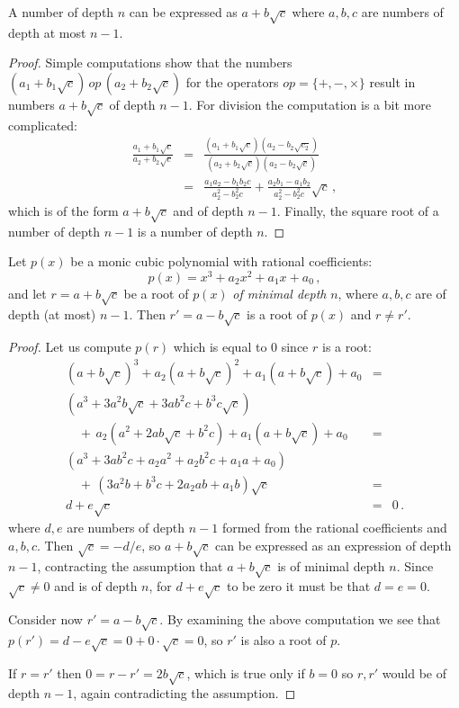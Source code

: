 \begin{theorem}
A number of depth $n$ can be expressed as $a+b\sqrt{c}$ where $a,b,c$ are numbers of depth at most $n-1$.
\end{theorem}
\begin{proof}
Simple computations show that the numbers $(a_1+b_1\sqrt{c})\,\mathit{op}\,(a_2+b_2\sqrt{c})$ for the operators $\mathit{op}=\{+,-,\times\}$ result in numbers $a+b\sqrt{c}$ of depth $n-1$. For division the computation is a bit more complicated:
\begin{eqnarray*}
\frac{a_1+b_1\sqrt{c}}{a_2+b_2\sqrt{c}}&=&
\frac{(a_1+b_1\sqrt{c})(a_2-b_2\sqrt{c_2})}{(a_2+b_2\sqrt{c})(a_2-b_2\sqrt{c})}\\
&=&\frac{a_1a_2-b_1b_2c}{a_2^2-b_2^2c}+\frac{a_2b_1-a_1b_2}{a_2^2-b_2^2c}\sqrt{c}\,,
\end{eqnarray*}
which is of the form $a+b\sqrt{c}$ and of depth $n-1$.
Finally, the square root of a number of depth $n-1$ is a number of depth $n$.
\end{proof}


\begin{theorem}\label{thm.trisect.conjugate}
Let $p(x)$ be a monic cubic polynomial with rational coefficients:
\[
p(x)=x^3+a_2x^2+a_1x+a_0\,,
\]
and let $r=a+b\sqrt{c}$ be a root of $p(x)$ \emph{of minimal depth} $n$, where $a,b,c$ are of depth (at most) $n-1$. Then $r'=a-b\sqrt{c}$ is a root of $p(x)$ and $r\neq r'$.
\end{theorem}

\newpage

\begin{proof} Let us compute $p(r)$ which is equal to $0$ since $r$ is a root:
\[
\renewcommand{\arraystretch}{1.4}
\begin{array}{lcr}
(a+b\sqrt{c})^3+a_2(a+b\sqrt{c})^2+a_1(a+b\sqrt{c})+a_0&=\\
(a^3+3a^2b\sqrt{c}+3ab^2c+b^3c\sqrt{c})\\
\quad+\,a_2(a^2+2ab\sqrt{c}+b^2c) +a_1(a+b\sqrt{c}) +a_0&=\\
(a^3+3ab^2c+a_2a^2+a_2b^2c+a_1a+a_0)\\
\quad+\,(3a^2b+b^3c+2a_2ab+a_1b)\sqrt{c}&=\\
d+e\sqrt{c}&=&0\,.
\end{array}
\]
where $d,e$ are numbers of depth $n-1$ formed from the rational coefficients and $a,b,c$. Then $\sqrt{c}=-d/e$, so $a+b\sqrt{c}$ can be expressed as an expression of depth $n-1$, contracting the assumption that $a+b\sqrt{c}$ is of minimal depth $n$. Since $\sqrt{c}\neq 0$ and is of depth $n$, for $d+e\sqrt{c}$ to be zero it must be that $d=e=0$.

Consider now $r'=a-b\sqrt{c}$. By examining the above computation we see that $p(r')=d-e\sqrt{c}=0+0\cdot\sqrt{c}=0$, so $r'$ is also a root of $p$.

If $r= r'$ then $0=r-r'=2b\sqrt{c}$, which is true only if $b=0$ so $r,r'$ would be of depth $n-1$, again contradicting the assumption.
\end{proof}                                

